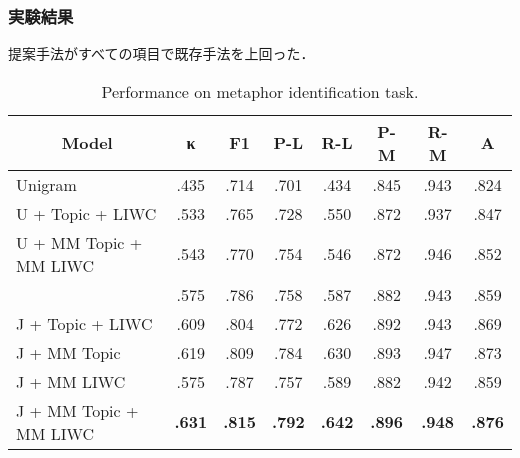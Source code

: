 \documentclass[11pt,usepdftitle=false]{beamer}
\newcommand\tableheader[1]{\multicolumn{1}{c}{\textbf{#1}}}
\let\oldcite=\citet
\renewcommand\citet[1]{\hyperlink{#1}{\oldcite{#1}}}
\begin{document}
\begin{frame}
    \frametitle{実験結果}
    提案手法がすべての項目で既存手法を上回った．
    \begin{table}
        \centering
        \scriptsize
        \caption{Performance on metaphor identification task.}
        \begin{tabular}{lccccccc}
            \toprule
            \tableheader{Model} &
            \tableheader{κ}     &
            \tableheader{F1}    &
            \tableheader{P-L}   &
            \tableheader{R-L}   &
            \tableheader{P-M}   &
            \tableheader{R-M}   &
            \tableheader{A}     \\
            \midrule
            Unigram                 & .435 & .714 & .701 & .434 & .845 & .943 & .824 \\
            U + Topic + LIWC        & .533 & .765 & .728 & .550 & .872 & .937 & .847 \\
            U + MM Topic + MM LIWC  & .543 & .770 & .754 & .546 & .872 & .946 & .852 \\
            \midrule
            \citet{jang2015}        & .575 & .786 & .758 & .587 & .882 & .943 & .859 \\
            J + Topic + LIWC        & .609 & .804 & .772 & .626 & .892 & .943 & .869 \\
            J + MM Topic            & .619 & .809 & .784 & .630 & .893 & .947 & .873 \\
            J + MM LIWC             & .575 & .787 & .757 & .589 & .882 & .942 & .859 \\
            J + MM Topic + MM LIWC  &
            \textbf{.631} &
            \textbf{.815} &
            \textbf{.792} &
            \textbf{.642} &
            \textbf{.896} &
            \textbf{.948} &
            \textbf{.876} \\
            \bottomrule
        \end{tabular}
    \end{table}
\end{frame}
\end{document}
